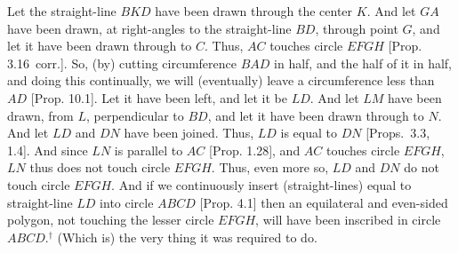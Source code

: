 \begin{Parallel}{}{}
{Let the straight-line $BKD$ have been drawn through the center $K$. And let $GA$ have been drawn, at right-angles to the
straight-line $BD$, through point $G$, and let it have been drawn through to $C$. Thus, $AC$ touches  circle $EFGH$ [Prop. 3.16~corr.]. 
So, (by) cutting circumference $BAD$ in half, and the half of it in half, and 
doing this continually, we will (eventually) leave
a circumference less than $AD$ [Prop. 10.1]. Let it have been left, and let it be $LD$. And let $LM$ have been drawn, from $L$, 
perpendicular to $BD$, and let it have been drawn through to $N$. And let $LD$ and $DN$ have been joined. 
Thus, $LD$ is equal to $DN$ [Props.~3.3, 1.4]. 
And since $LN$ is
parallel to $AC$ [Prop. 1.28], and $AC$ touches circle $EFGH$, $LN$ thus does not touch circle $EFGH$. Thus,
even more so, $LD$ and $DN$ do not touch circle $EFGH$. And if we continuously insert (straight-lines) equal to straight-line
$LD$ into circle $ABCD$ [Prop. 4.1] then an equilateral and even-sided polygon, not touching
the lesser circle $EFGH$, will have been inscribed in circle $ABCD$.$^\dag$ (Which is) the very thing it was required to do.}
\end{Parallel}


\vspace{7pt}{\footnotesize\noindent$^\dag$ Note that the chord of the polygon, $LN$, does not touch the inner circle either.}

